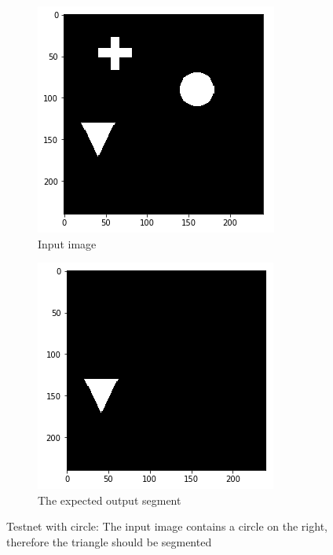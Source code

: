 \begin{figure}[H]
    \centering
    \begin{subfigure}{.5\textwidth}
        \centering
        \includegraphics[width=\linewidth]{chapters/05_testnet/images/testnet_a-0.png}
        \caption{Input image}
    \end{subfigure}%
    \begin{subfigure}{.5\textwidth}
        \centering
        \includegraphics[width=\linewidth]{chapters/05_testnet/images/testnet_a-1.png}
        \caption{The expected output segment}
    \end{subfigure}
    \caption{Testnet with circle: The input image contains a circle on the right, therefore the triangle should be segmented}
    \label{testnet_example_1}
\end{figure}

